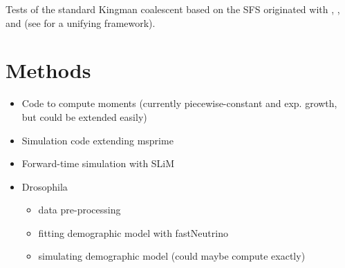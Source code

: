 \documentclass[11pt, letterpaper]{article}   	%
\begin{document}
Tests of the standard Kingman coalescent based on the SFS originated with \cite{Tajima1989}, \cite{FuLi1993}, and \cite{SimonsenEtAl1995} (see \cite{Achaz2009} for a unifying framework).

\section*{Methods}
\begin{itemize}
    \item Code to compute moments (currently piecewise-constant and exp. growth, but could be extended easily)
    \item Simulation code extending msprime
    \item Forward-time simulation with SLiM
    \item Drosophila
    \begin{itemize}
        \item data pre-processing
        \item fitting demographic model with fastNeutrino
        \item simulating demographic model (could maybe compute exactly)
    \end{itemize}
\end{itemize}

\printbibliography
\end{document}

